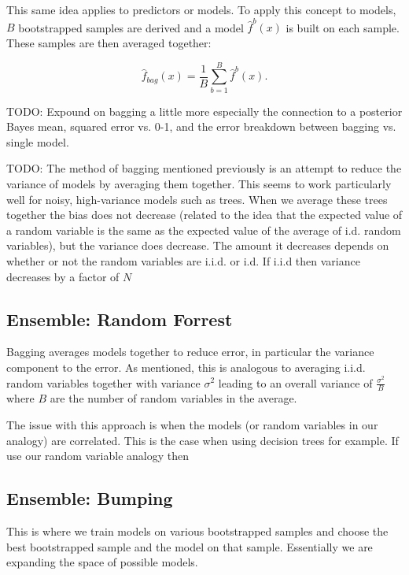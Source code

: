 \documentclass[paper=a4, fontsize=11pt]{scrartcl} %
\numberwithin{equation}{section} %
\numberwithin{figure}{section} %
\numberwithin{table}{section} %
\begin{document}
This same idea applies to predictors or models. To apply this concept to models, $B$ bootstrapped samples are derived and a model $\hat{f}^b(x)$ is built on each sample. These samples are then averaged together:

\begin{equation}
\hat{f}_{bag}(x) = \frac{1}{B} \sum_{b=1}^B{\hat{f}^b(x)}.
\end{equation}

TODO: Expound on bagging a little more especially the connection to a posterior Bayes mean, squared error vs. 0-1, and the error breakdown between bagging vs. single model.

TODO: The method of bagging mentioned previously is an attempt to reduce the variance of models by averaging them together. This seems to work particularly well for noisy, high-variance models such as trees. When we average these trees together the bias does not decrease (related to the idea that the expected value of a random variable is the same as the expected value of the average of i.d. random variables), but the variance does decrease. The amount it decreases depends on whether or not the random variables are i.i.d. or i.d. If i.i.d then variance decreases by a factor of $N$

\subsection{Ensemble: Random Forrest}

Bagging averages models together to reduce error, in particular the variance component to the error. As mentioned, this is analogous to averaging i.i.d. random variables together with variance $\sigma^2$ leading to an overall variance of $\frac{\sigma^2}{B}$ where $B$ are the number of random variables in the average. 

The issue with this approach is when the models (or random variables in our analogy) are correlated. This is the case when using decision trees for example. If use our random variable analogy then 



\subsection{Ensemble: Bumping}
This is where we train models on various bootstrapped samples and choose the best bootstrapped sample and the model on that sample. Essentially we are expanding the space of possible models.
\end{document}

